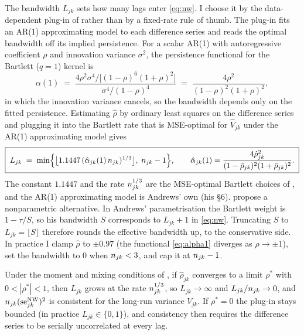 The bandwidth $L_{jk}$ sets how many lags enter \eqref{eq:nw}. I choose it by the
data-dependent plug-in of \citet{andrews1991} rather than by a fixed-rate rule of thumb.
The plug-in fits an AR(1) approximating model to each difference series and reads the
optimal bandwidth off its implied persistence. For a scalar AR(1) with autoregressive
coefficient $\rho$ and innovation variance $\sigma^2$, the
\citet[eq.~6.4]{andrews1991} persistence functional for the Bartlett ($q=1$) kernel is
\begin{equation}
  \alpha(1)
  \;=\; \frac{4\rho^2\sigma^4/\big[(1-\rho)^6(1+\rho)^2\big]}
             {\sigma^4/(1-\rho)^4}
  \;=\; \frac{4\rho^2}{(1-\rho)^2(1+\rho)^2},
  \label{eq:alpha1}
\end{equation}
in which the innovation variance cancels, so the bandwidth depends only on the fitted
persistence. Estimating $\hat\rho$ by ordinary least squares on the difference series
and plugging it into the Bartlett rate that is MSE-optimal for $\hat V_{jk}$ under the
AR(1) approximating model gives
\begin{equation}
  \boxed{\;
  L_{jk} \;=\; \min\!\Big\{\big\lfloor 1.1447\,(\hat\alpha_{jk}(1)\,n_{jk})^{1/3}\big\rfloor,\;
  n_{jk}-1 \Big\},
  \qquad
  \hat\alpha_{jk}(1)=\frac{4\hat\rho_{jk}^2}{(1-\hat\rho_{jk})^2(1+\hat\rho_{jk})^2}.
  \;}
  \label{eq:andrews}
\end{equation}
The constant $1.1447$ and the rate $n_{jk}^{1/3}$ are the MSE-optimal Bartlett choices of
\citet[Thm.~1, eq.~6.2]{andrews1991}, and the AR(1) approximating model is Andrews' own
(his \S6). \citet{neweywest1994} propose a nonparametric alternative. In Andrews'
parametrisation the Bartlett weight is $1-\tau/S$, so his bandwidth $S$ corresponds to
$L_{jk}+1$ in \eqref{eq:nw}. Truncating $S$ to $L_{jk}=\lfloor S\rfloor$ therefore
rounds the effective bandwidth up, to the conservative side. In practice I clamp
$\hat\rho$ to $\pm 0.97$ (the functional \eqref{eq:alpha1} diverges as $\rho\to\pm 1$),
set the bandwidth to $0$ when $n_{jk}<3$, and cap it at $n_{jk}-1$.

Under the moment and mixing conditions of \citet{andrews1991}, if $\hat\rho_{jk}$
converges to a limit $\rho^*$ with $0<|\rho^*|<1$, then $L_{jk}$ grows at the rate
$n_{jk}^{1/3}$, so $L_{jk}\to\infty$ and $L_{jk}/n_{jk}\to 0$, and
$n_{jk}(\mathrm{se}^{\mathrm{NW}}_{jk})^2$ is consistent for the long-run variance $V_{jk}$. If $\rho^*=0$
the plug-in stays bounded (in practice $L_{jk}\in\{0,1\}$), and consistency then
requires the difference series to be serially uncorrelated at every lag.

